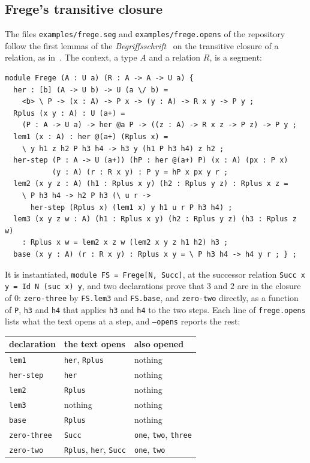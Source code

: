 \documentclass[11pt]{article}
\newcommand{\kw}[1]{\texttt{#1}}
\begin{document}
\subsection{Frege's transitive closure}

The files
\texttt{examples/frege.seg} and \texttt{examples/frege.opens} of the
repository follow the first lemmas of the
\emph{Begriffsschrift}~\cite{Frege} on the transitive closure of a
relation, as in~\cite[\S2.4.3]{Rem}. The context, a type $A$ and a
relation $R$, is a segment:
\begin{verbatim}
module Frege (A : U a) (R : A -> A -> U a) {
  her : [b] (A -> U b) -> U (a \/ b) =
    <b> \ P -> (x : A) -> P x -> (y : A) -> R x y -> P y ;
  Rplus (x y : A) : U (a+) =
    (P : A -> U a) -> her @a P -> ((z : A) -> R x z -> P z) -> P y ;
  lem1 (x : A) : her @(a+) (Rplus x) =
    \ y h1 z h2 P h3 h4 -> h3 y (h1 P h3 h4) z h2 ;
  her-step (P : A -> U (a+)) (hP : her @(a+) P) (x : A) (px : P x)
           (y : A) (r : R x y) : P y = hP x px y r ;
  lem2 (x y z : A) (h1 : Rplus x y) (h2 : Rplus y z) : Rplus x z =
    \ P h3 h4 -> h2 P h3 (\ u r ->
      her-step (Rplus x) (lem1 x) y h1 u r P h3 h4) ;
  lem3 (x y z w : A) (h1 : Rplus x y) (h2 : Rplus y z) (h3 : Rplus z w)
    : Rplus x w = lem2 x z w (lem2 x y z h1 h2) h3 ;
  base (x y : A) (r : R x y) : Rplus x y = \ P h3 h4 -> h4 y r ; } ;
\end{verbatim}
It is instantiated, \kw{module FS = Frege[N, Succ]}, at the successor
relation \kw{Succ x y = Id N (suc x) y}, and two declarations prove that
$3$ and $2$ are in the closure of $0$: \kw{zero-three} by
\kw{FS.lem3} and \kw{FS.base}, and \kw{zero-two} directly, as a
function of \kw{P}, \kw{h3} and \kw{h4} that applies \kw{h3} and
\kw{h4} to the two steps.
Each line of \texttt{frege.opens} lists what the text opens at a step,
and \kw{--opens} reports the rest:
\begin{center}
\begin{tabular}{lll}
\toprule
declaration & the text opens & also opened\\
\midrule
\kw{lem1} & \kw{her}, \kw{Rplus} & nothing\\
\kw{her-step} & \kw{her} & nothing\\
\kw{lem2} & \kw{Rplus} & nothing\\
\kw{lem3} & nothing & nothing\\
\kw{base} & \kw{Rplus} & nothing\\
\kw{zero-three} & \kw{Succ} & \kw{one}, \kw{two}, \kw{three}\\
\kw{zero-two} & \kw{Rplus}, \kw{her}, \kw{Succ} & \kw{one}, \kw{two}\\
\bottomrule
\end{tabular}
\end{center}
\end{document}
